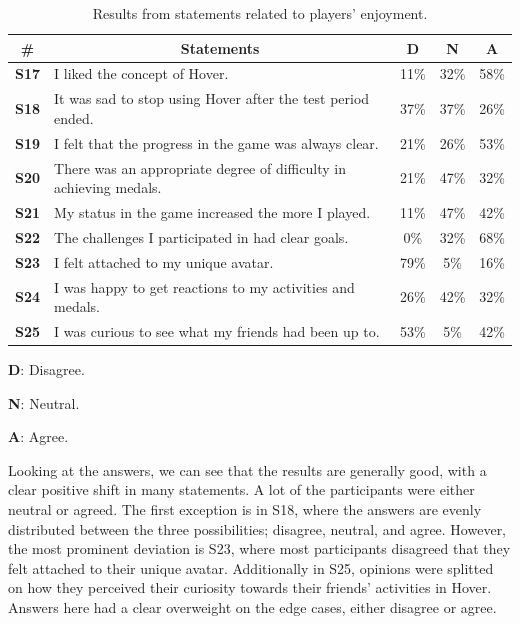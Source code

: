 \begin{table}[H]
    \begin{threeparttable}[t]
    \small
    \begin{tabularx}{\textwidth}{|c|X|c|c|c|}
        \hline
        \multicolumn{1}{|c|}{\textbf{\#}} &
        \multicolumn{1}{c|}{\textbf{Statements}}  & 
        \multicolumn{1}{c|}{\textbf{D}} & 
        \multicolumn{1}{c|}{\textbf{N}}  & 
        \multicolumn{1}{c|}{\textbf{A}} \\ \hline
        \textbf{S17} & I liked the concept of Hover. & 11\% & 32\% & 58\%  \\
        \textbf{S18} & It was sad to stop using Hover after the test period ended. & 37\% & 37\% & 26\%  \\
        \textbf{S19} & I felt that the progress in the game was always clear. & 21\% & 26\% & 53\%  \\
        \textbf{S20} & There was an appropriate degree of difficulty in achieving medals. & 21\% & 47\% & 32\%  \\
        \textbf{S21} & My status in the game increased the more I played. & 11\% & 47\% & 42\%  \\
        \textbf{S22} & The challenges I participated in had clear goals. & 0\% & 32\% & 68\%  \\
        \textbf{S23} & I felt attached to my unique avatar. & 79\% & 5\% & 16\%  \\
        \textbf{S24} & I was happy to get reactions to my activities and medals. & 26\% & 42\% & 32\%  \\
        \textbf{S25} & I was curious to see what my friends had been up to. & 53\% & 5\% & 42\%  \\
        \hline
    \end{tabularx}
    \begin{tablenotes}
    \scriptsize
     \item[] \textbf{D}: Disagree.
     \item[] \textbf{N}: Neutral.
     \item[] \textbf{A}: Agree.
  \end{tablenotes}
  \end{threeparttable}
    \caption{Results from statements related to players’ enjoyment.}
    \label{tab:enjoyment_statements}
    \vspace*{-\baselineskip}
\end{table}

Looking at the answers, we can see that the results are generally good, with a clear positive shift in many statements. A lot of the participants were either neutral or agreed. The first exception is in S18, where the answers are evenly distributed between the three possibilities; disagree, neutral, and agree. However, the most prominent deviation is S23, where most participants disagreed that they felt attached to their unique avatar. Additionally in S25, opinions were splitted on how they perceived their curiosity towards their friends' activities in Hover. Answers here had a clear overweight on the edge cases, either disagree or agree.

